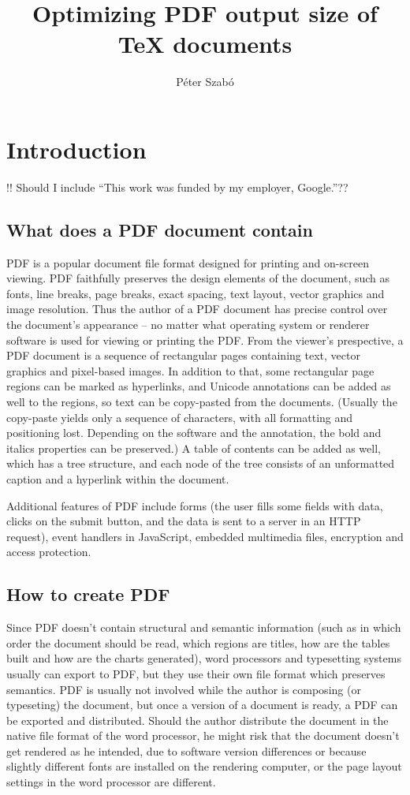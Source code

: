 \documentclass{ltugproc}
\title{Optimizing PDF output size of \TeX{} documents}
\author{P\'eter Szab\'o}
\begin{document}
\maketitle

\section{Introduction}

!! Should I include ``This work was funded by my employer, Google.''??

\subsection{What does a PDF document contain}

PDF is a popular document file format designed for printing and on-screen
viewing. PDF faithfully preserves the design elements of the document, such
as fonts, line breaks, page breaks, exact spacing, text layout, vector
graphics and image resolution. Thus the author of a PDF document has precise
control over the document's appearance -- no matter what operating system or
renderer software is used for viewing or printing the PDF. From the viewer's
prespective, a PDF document is a sequence of rectangular pages containing
text, vector graphics and pixel-based images. In addition to that, some
rectangular page regions can be marked as hyperlinks, and Unicode
annotations can be added as well to the regions, so text can be copy-pasted
from the documents. (Usually the copy-paste yields only a sequence of
characters, with all formatting and positioning lost. Depending on the
software and the annotation, the bold and italics properties can be
preserved.) A table of contents can be added as well, which has a tree
structure, and each node of the tree consists of an unformatted caption and
a hyperlink within the document.

Additional features of PDF include forms (the user fills some fields with
data, clicks on the submit button, and the data is sent to a server in an
HTTP request), event handlers in JavaScript, embedded multimedia files,
encryption and access protection.

\subsection{How to create PDF}

Since PDF doesn't contain structural and semantic information (such as
in which order the document should be read, which regions are titles, how
are the tables built and how are the charts generated), word processors and
typesetting systems usually can export to PDF, but they use their own file
format which preserves semantics. PDF is usually not involved while the
author is composing (or typeseting) the document, but once a version of a
document is ready, a PDF can be exported and distributed. Should the author
distribute the document in the native file format of the word processor, he
might risk that the document doesn't get rendered as he intended, due to
software version differences or because slightly different fonts are
installed on the rendering computer, or the page layout settings in the word
processor are different.
\end{document}
